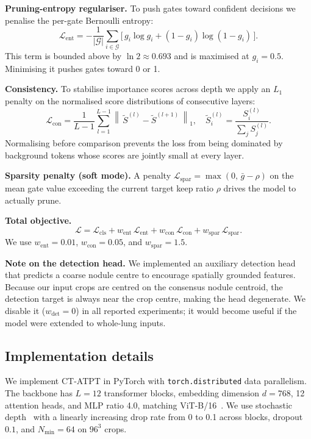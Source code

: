 \documentclass[journal]{IEEEtran}
\newcommand{\norm}[1]{\left\lVert#1\right\rVert}
\newcommand{\Lcls}{\mathcal{L}_{\mathrm{cls}}}
\newcommand{\Lent}{\mathcal{L}_{\mathrm{ent}}}
\newcommand{\Lcon}{\mathcal{L}_{\mathrm{con}}}
\newcommand{\Lspar}{\mathcal{L}_{\mathrm{spar}}}
\begin{document}
\textbf{Pruning-entropy regulariser.} To push gates toward confident
decisions we penalise the per-gate Bernoulli entropy:
\begin{equation}
    \Lent = -\frac{1}{|\mathcal{G}|} \sum_{i\in\mathcal{G}}
    \big[\, g_i \log g_i + (1 - g_i) \log(1 - g_i) \,\big].
\end{equation}
This term is bounded above by $\ln 2 \approx 0.693$ and is maximised at
$g_i = 0.5$. Minimising it pushes gates toward 0 or 1.

\textbf{Consistency.} To stabilise importance scores across depth we apply an
$L_1$ penalty on the normalised score distributions of consecutive layers:
\begin{equation}
    \Lcon = \frac{1}{L-1} \sum_{l=1}^{L-1}
    \norm{\, \tilde{S}^{(l)} - \tilde{S}^{(l+1)} \,}_{1},
    \quad
    \tilde{S}^{(l)}_i = \frac{S^{(l)}_i}{\sum_j S^{(l)}_j}.
\end{equation}
Normalising before comparison prevents the loss from being dominated by
background tokens whose scores are jointly small at every layer.

\textbf{Sparsity penalty (soft mode).} A penalty
$\Lspar = \max(0,\, \bar{g} - \rho)$ on the mean gate value exceeding the
current target keep ratio $\rho$ drives the model to actually prune.

\textbf{Total objective.}
\begin{equation}
    \mathcal{L} = \Lcls
        + w_{\mathrm{ent}}\,\Lent
        + w_{\mathrm{con}}\,\Lcon
        + w_{\mathrm{spar}}\,\Lspar.
\end{equation}
We use $w_{\mathrm{ent}} = 0.01$, $w_{\mathrm{con}} = 0.05$, and
$w_{\mathrm{spar}} = 1.5$.

\textbf{Note on the detection head.} We implemented an auxiliary detection
head that predicts a coarse nodule centre to encourage spatially grounded
features. Because our input crops are centred on the consensus nodule
centroid, the detection target is always near the crop centre, making the head
degenerate. We disable it ($w_{\mathrm{det}} = 0$) in all reported
experiments; it would become useful if the model were extended to whole-lung
inputs.

\subsection{Implementation details}\label{ssec:impl}
We implement CT-ATPT in PyTorch with \texttt{torch.distributed} data
parallelism. The backbone has $L = 12$ transformer blocks, embedding
dimension $d = 768$, 12 attention heads, and MLP ratio 4.0, matching
ViT-B/16~\cite{dosovitskiy2021}. We use stochastic depth~\cite{huang2016}
with a linearly increasing drop rate from 0 to 0.1 across blocks, dropout
$0.1$, and $N_{\min} = 64$ on $96^3$ crops.
\end{document}
